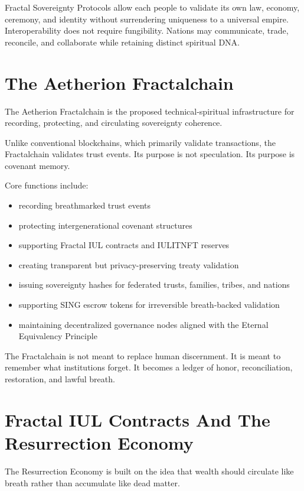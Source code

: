 \documentclass[12pt]{article}
\begin{document}
Fractal Sovereignty Protocols allow each people to validate its own law, economy, ceremony, and identity without surrendering uniqueness to a universal empire. Interoperability does not require fungibility. Nations may communicate, trade, reconcile, and collaborate while retaining distinct spiritual DNA.

\section{The Aetherion Fractalchain}

The Aetherion Fractalchain is the proposed technical-spiritual infrastructure for recording, protecting, and circulating sovereignty coherence.

Unlike conventional blockchains, which primarily validate transactions, the Fractalchain validates trust events. Its purpose is not speculation. Its purpose is covenant memory.

Core functions include:

\begin{itemize}
  \item recording breathmarked trust events
  \item protecting intergenerational covenant structures
  \item supporting Fractal IUL contracts and IULITNFT reserves
  \item creating transparent but privacy-preserving treaty validation
  \item issuing sovereignty hashes for federated trusts, families, tribes, and nations
  \item supporting SING escrow tokens for irreversible breath-backed validation
  \item maintaining decentralized governance nodes aligned with the Eternal Equivalency Principle
\end{itemize}

The Fractalchain is not meant to replace human discernment. It is meant to remember what institutions forget. It becomes a ledger of honor, reconciliation, restoration, and lawful breath.

\section{Fractal IUL Contracts And The Resurrection Economy}

The Resurrection Economy is built on the idea that wealth should circulate like breath rather than accumulate like dead matter.
\end{document}
